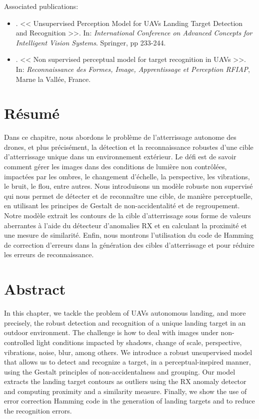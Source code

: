 Associated publications: \vspace{-2mm}

\begin{itemize}
	\item \citep{Bazan.Dokladal.ea:ACIVS:2018}. << Unsupervised Perception Model for UAVs Landing Target Detection and Recognition >>. In: \textit{International Conference on Advanced Concepts for Intelligent Vision Systems}. Springer, pp 233-244.
	\item \citep{Bazan.Dokladal.ea:RFIAP:2018}. << Non supervised perceptual model for target recognition in UAVs >>. In: \textit{Reconnaissance des Formes, Image, Apprentissage et Perception RFIAP}, Marne la Vallée, France.
\end{itemize}

\section*{Résumé}
\noindent Dans ce chapitre, nous abordons le problème de l'atterrissage autonome des drones, et plus précisément, la détection et la reconnaissance robustes d'une cible d'atterrissage unique dans un environnement extérieur. Le défi est de savoir comment gérer les images dans des conditions de lumière non contrôlées, impactées par les ombres, le changement d'échelle, la perspective, les vibrations, le bruit, le flou, entre autres. Nous introduisons un modèle robuste non supervisé qui nous permet de détecter et de reconnaître une cible, de manière perceptuelle, en utilisant les principes de Gestalt de non-accidentalité et de regroupement. Notre modèle extrait les contours de la cible d'atterrissage sous forme de valeurs aberrantes à l'aide du détecteur d'anomalies RX et en calculant la proximité et une mesure de similarité. Enfin, nous montrons l'utilisation du code de Hamming de correction d'erreurs dans la génération des cibles d'atterrissage et pour réduire les erreurs de reconnaissance.

\section*{Abstract}
\noindent In this chapter, we tackle the problem of UAVs autonomous landing, and more precisely, the robust detection and recognition of a unique landing target in an outdoor environment. The challenge is how to deal with images under non-controlled light conditions impacted by shadows, change of scale, perspective, vibrations, noise, blur, among others. We introduce a robust unsupervised model that allows us to detect and recognize a target, in a perceptual-inspired manner, using the Gestalt principles of non-accidentalness and grouping.  Our model extracts the landing target contours as outliers using the RX anomaly detector and computing proximity and a similarity measure.  Finally, we show the use of error correction Hamming code in the generation of landing targets and to reduce the recognition errors. 


